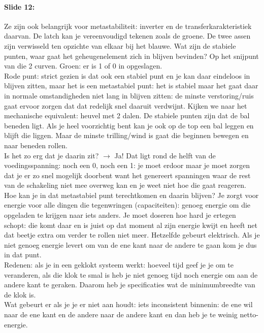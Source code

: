 \documentclass[10pt,a4paper]{book}
\begin{document}
\paragraph{Slide 12:} Ze zijn ook belangrijk voor metastabiliteit: inverter en de transferkarakteristiek daarvan. De latch kan je vereenvoudigd tekenen zoals de groene. De twee assen zijn verwisseld ten opzichte van elkaar bij het blauwe. Wat zijn de stabiele punten, waar gaat het geheugenelement zich in blijven bevinden? Op het snijpunt van die 2 curven. Groen: er is 1 of 0 in opgeslagen.\\
Rode punt: strict gezien is dat ook een stabiel punt en je kan daar eindeloos in blijven zitten, maar het is een metastabiel punt: het is stabiel maar het gaat daar in normale omstandigheden niet lang in blijven zitten: de minste verstoring/ruis gaat ervoor zorgen dat dat redelijk snel daaruit verdwijnt. Kijken we naar het mechanische equivalent: heuvel met 2 dalen. De stabiele punten zijn dat de bal beneden ligt. Als je heel voorzichtig bent kan je ook op de top een bal leggen en blijft die liggen. Maar de minste trilling/wind is gaat die beginnen bewegen en naar beneden rollen.\\
Is het zo erg dat je daarin zit? $\rightarrow$ Ja! Dat ligt rond de helft van de voedingsspanning: noch een 0, noch een 1: je moet erdoor maar je moet zorgen dat je er zo snel mogelijk doorbent want het genereert spanningen waar de rest van de schakeling niet mee overweg kan en je weet niet hoe die gaat reageren.\\
Hoe kan je in dat metastabiel punt terechtkomen en daarin blijven? Je zorgt voor energie voor alle dingen die tegenwringen (capaciteiten): genoeg energie om die opgeladen te krijgen naar iets anders. Je moet doseren hoe hard je ertegen schopt: die komt daar en is juist op dat moment al zijn energie kwijt en heeft net dat beetje extra om verder te rollen niet meer. Hetzelfde gebeurt elektrisch. Als je niet genoeg energie levert om van de ene kant naar de andere te gaan kom je dus in dat punt.\\
Redenen: als je in een geklokt systeem werkt: hoeveel tijd geef je je om te veranderen, als die klok te smal is heb je niet genoeg tijd noch energie om aan de andere kant te geraken. Daarom heb je specificaties wat de minimumbreedte van de klok is.\\
Wat gebeurt er als je je er niet aan houdt: iets inconsistent binnenin: de ene wil naar de ene kant en de andere naar de andere kant en dan heb je te weinig netto-energie.\\
\end{document}
